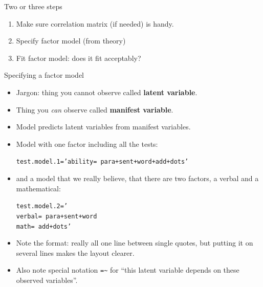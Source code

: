 \documentclass[unknownkeysallowed]{beamer}\usepackage[]{graphicx}\usepackage[]{color}
\makeatletter
\newcommand{\hlstr}[1]{\textcolor[rgb]{0.192,0.494,0.8}{#1}}%
\newcommand{\hlstd}[1]{\textcolor[rgb]{0.345,0.345,0.345}{#1}}%
\newcommand{\hlkwb}[1]{\textcolor[rgb]{0.69,0.353,0.396}{#1}}%
\newenvironment{kframe}{%
 \def\at@end@of@kframe{}%
 \ifinner\ifhmode%
  \def\at@end@of@kframe{\end{minipage}}%
  \begin{minipage}{\columnwidth}%
 \fi\fi%
 \def\FrameCommand##1{\hskip\@totalleftmargin \hskip-\fboxsep
 \colorbox{shadecolor}{##1}\hskip-\fboxsep
     \hskip-\linewidth \hskip-\@totalleftmargin \hskip\columnwidth}%
 \MakeFramed {\advance\hsize-\width
   \@totalleftmargin\z@ \linewidth\hsize
   \@setminipage}}%
 {\par\unskip\endMakeFramed%
 \at@end@of@kframe}
\newenvironment{knitrout}{}{} %
\makeatother
\begin{document}
\begin{frame}[fragile]{Two or three steps}
  
  \begin{enumerate}
  \item Make sure correlation matrix (if needed) is handy.
  \item Specify factor model (from theory)
  \item Fit factor model: does it fit acceptably? 
  \end{enumerate}
  
  
\end{frame}

\begin{frame}[fragile]{Specifying a factor model}
  
  \begin{itemize}

  \item Jargon: thing you cannot observe called \textbf{latent variable}.
  \item Thing you \emph{can} observe called \textbf{manifest variable}.
  \item Model predicts latent variables from manifest variables.
  \item Model with one factor including all the tests:
    

\begin{knitrout}
\color{fgcolor}\begin{kframe}
\begin{alltt}
\hlstd{test.model.1}\hlkwb{=}\hlstr{'ability=~para+sent+word+add+dots'}
\end{alltt}
\end{kframe}
\end{knitrout}

\item and a model that we really believe, that there are two factors,
  a verbal and a mathematical:
  

\begin{knitrout}
\color{fgcolor}\begin{kframe}
\begin{alltt}
\hlstd{test.model.2}\hlkwb{=}\hlstr{'
    verbal=~para+sent+word
    math=~add+dots'}
\end{alltt}
\end{kframe}
\end{knitrout}
  
\item Note the format: really all one line between single quotes, but
  putting it on several lines makes the layout clearer.
\item Also note special notation \texttt{=\textasciitilde} for ``this latent
  variable depends on these observed variables''.  
    
  \end{itemize}
  
\end{frame}
\end{document}
